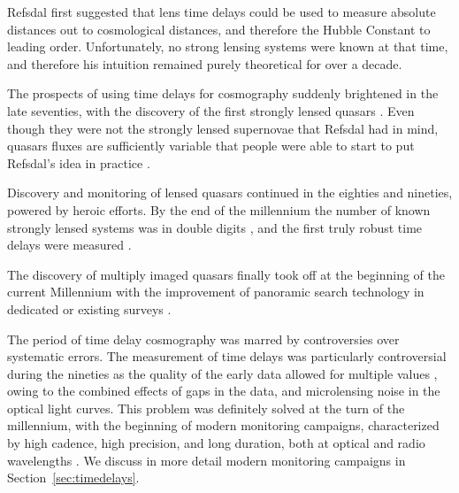 Refsdal \cite{Ref64} first suggested that lens time delays could be
used to measure absolute distances out to cosmological distances, and
therefore the Hubble Constant to leading order. Unfortunately, no
strong lensing systems were known at that time, and therefore his
intuition remained purely theoretical for over a decade. 

The prospects of using time delays for cosmography suddenly brightened
in the late seventies, with the discovery of the first strongly lensed
quasars \cite{WCW79}. Even though they were not the strongly lensed
supernovae that Refsdal had in mind, quasars fluxes are sufficiently
variable \cite{Van82} that people were able to start to put Refsdal's
idea in practice \cite{Van89}.

Discovery and monitoring of lensed quasars continued in the eighties
and nineties, powered by heroic efforts. By the end of the millennium
the number of known strongly lensed systems was in double digits
\cite{CCS02}, and the first truly robust time delays were measured
\cite{Kun++97,Sch++97}. 

The discovery of multiply imaged quasars finally took off at the
beginning of the current Millennium with the improvement of panoramic
search technology in dedicated or existing surveys
\cite{Bro++03,Oguri:2006p5865,Agn+15}.

The period of time delay cosmography was marred by controversies over
systematic errors.  The measurement of time delays was particularly
controversial during the nineties as the quality of the early data
allowed for multiple values \cite[e.g.,][]{PRH92}, owing to the
combined effects of gaps in the data, and microlensing noise in the
optical light curves. This problem was definitely solved at the turn
of the millennium, with the beginning of modern monitoring campaigns,
characterized by high cadence, high precision, and long duration, both
at optical and radio wavelengths
\cite{Fas++99,Fas++02,Bur++02,Eig++05}. We discuss in more detail 
modern monitoring campaigns in Section~\ref{sec:timedelays}.

